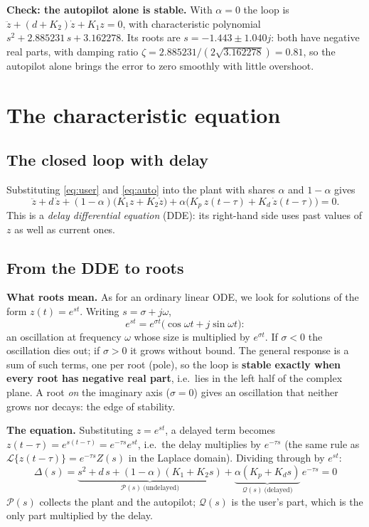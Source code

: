 \documentclass[11pt,a4paper]{article}
\theoremstyle{definition}
\begin{document}
\textbf{Check: the autopilot alone is stable.} With $\alpha = 0$ the loop
is $\ddot z + (d + K_2)\dot z + K_1 z = 0$, with characteristic
polynomial $s^2 + 2.885231\,s + 3.162278$. Its roots are
$s = -1.443 \pm 1.040j$: both have negative real parts, with damping
ratio $\zeta = 2.885231/(2\sqrt{3.162278}) = 0.81$, so the autopilot
alone brings the error to zero smoothly with little overshoot.

\section{The characteristic equation}
\label{sec:char}

\subsection{The closed loop with delay}
Substituting \eqref{eq:user} and \eqref{eq:auto} into the plant with
shares $\alpha$ and $1-\alpha$ gives
\begin{equation}
\ddot z + d\,\dot z
+ (1-\alpha)\bigl(K_1 z + K_2 \dot z\bigr)
+ \alpha\bigl(K_p\, z(t-\tau) + K_d\, \dot z(t-\tau)\bigr) = 0 .
\label{eq:dde}
\end{equation}
This is a \emph{delay differential equation} (DDE): its right-hand side
uses past values of $z$ as well as current ones.

\subsection{From the DDE to roots}
\textbf{What roots mean.} As for an ordinary linear ODE, we look for
solutions of the form $z(t) = e^{st}$. Writing $s = \sigma + j\omega$,
\[
e^{st} = e^{\sigma t}\bigl(\cos\omega t + j\sin\omega t\bigr):
\]
an oscillation at frequency $\omega$ whose size is multiplied by
$e^{\sigma t}$. If $\sigma < 0$ the oscillation dies out; if
$\sigma > 0$ it grows without bound. The general response is a sum of
such terms, one per root (pole), so the loop is \textbf{stable exactly
when every root has negative real part}, i.e.\ lies in the left half of
the complex plane. A root \emph{on} the imaginary axis ($\sigma = 0$)
gives an oscillation that neither grows nor decays: the edge of
stability.

\textbf{The equation.} Substituting $z = e^{st}$, a delayed term becomes
$z(t-\tau) = e^{s(t-\tau)} = e^{-\tau s}e^{st}$, i.e.\ the delay
multiplies by $e^{-\tau s}$ (the same rule as
$\mathcal{L}\{z(t-\tau)\} = e^{-\tau s}Z(s)$ in the Laplace domain).
Dividing through by $e^{st}$:
\begin{equation}
\boxed{\;\Delta(s) = \underbrace{s^{2} + d\,s + (1-\alpha)(K_1 + K_2 s)}_{\mathcal{P}(s)\ \text{(undelayed)}}
+ \underbrace{\alpha (K_p + K_d s)}_{\mathcal{Q}(s)\ \text{(delayed)}}\,e^{-\tau s} = 0 \;}
\label{eq:char}
\end{equation}
$\mathcal{P}(s)$ collects the plant and the autopilot; $\mathcal{Q}(s)$
is the user's part, which is the only part multiplied by the delay.
\end{document}

